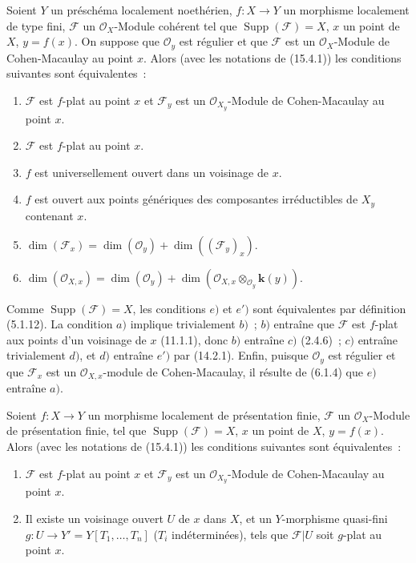 \begin{proposition}[15.4.2]
Soient $Y$ un préschéma localement noethérien, $f:X\to Y$ un morphisme localement
de type fini, $\mathcal F$ un $\mathcal O_X$-Module cohérent tel que
$\operatorname{Supp}(\mathcal F)=X$, $x$ un point de $X$, $y=f(x)$. On suppose
que $\mathcal O_y$ est régulier et que $\mathcal F$ est un $\mathcal O_X$-Module
de Cohen-Macaulay au point $x$. Alors (avec les notations de (15.4.1)) les
conditions suivantes sont équivalentes~:
\begin{enumerate}[label=\emph{\alph*})]
  \item $\mathcal F$ est $f$-plat au point $x$ et $\mathcal F_y$ est un
  $\mathcal O_{X_y}$-Module de Cohen-Macaulay au point $x$.
  \item $\mathcal F$ est $f$-plat au point $x$.
  \item $f$ est universellement ouvert dans un voisinage de $x$.
  \item $f$ est ouvert aux points génériques des composantes irréductibles de
  $X_y$ contenant $x$.
  \item $\dim(\mathcal F_x)=\dim(\mathcal O_y)+\dim((\mathcal F_y)_x)$.
  \item[\emph{e}$'$)]
  $\dim(\mathcal O_{X,x})=\dim(\mathcal O_y)+
  \dim(\mathcal O_{X,x}\otimes_{\mathcal O_y}\mathbf{k}(y))$.
\end{enumerate}
Comme $\operatorname{Supp}(\mathcal F)=X$, les conditions $e)$ et $e')$ sont
équivalentes par définition (5.1.12). La condition $a)$ implique trivialement
$b)$~; $b)$ entraîne que $\mathcal F$ est $f$-plat aux points d'un voisinage de
$x$ (11.1.1), donc $b)$ entraîne $c)$ (2.4.6)~; $c)$ entraîne trivialement $d)$,
et $d)$ entraîne $e')$ par (14.2.1). Enfin, puisque $\mathcal O_y$ est régulier
et que $\mathcal F_x$ est un $\mathcal O_{X,x}$-module de Cohen-Macaulay, il
résulte de (6.1.4) que $e)$ entraîne $a)$.
\end{proposition}

\begin{proposition}[15.4.3]
\label{IV.15.4.3-fr}
Soient $f:X\to Y$ un morphisme localement de présentation finie, $\mathcal F$ un
$\mathcal O_X$-Module de présentation finie, tel que
$\operatorname{Supp}(\mathcal F)=X$, $x$ un point de $X$, $y=f(x)$. Alors (avec
les notations de (15.4.1)) les conditions suivantes sont équivalentes~:
\begin{enumerate}[label=\emph{\alph*})]
  \item $\mathcal F$ est $f$-plat au point $x$ et $\mathcal F_y$ est un
  $\mathcal O_{X_y}$-Module de Cohen-Macaulay au point $x$.
  \item Il existe un voisinage ouvert $U$ de $x$ dans $X$, et un $Y$-morphisme
  quasi-fini $g:U\to Y'=Y[T_1,\ldots,T_n]$ ($T_i$ indéterminées), tels que
  $\mathcal F|U$ soit $g$-plat au point $x$.
\end{enumerate}
\end{proposition}

